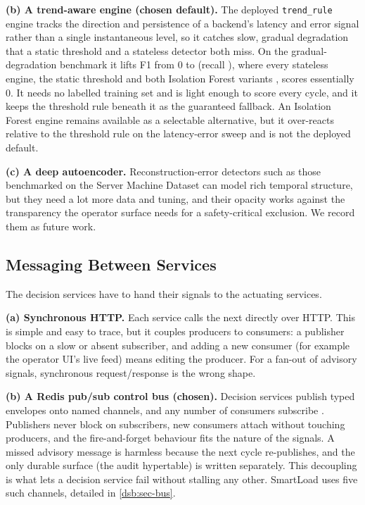 \textbf{(b) A trend-aware engine (chosen default).} The deployed
\texttt{trend\_rule} engine tracks the direction and persistence of a backend's
latency and error signal rather than a single instantaneous level, so it catches
slow, gradual degradation that a static threshold and a stateless detector both
miss. On the gradual-degradation benchmark it lifts F1 from $0$ to \BManFone{} (recall
\BManRecall{}), where every stateless engine, the static threshold and both Isolation
Forest variants \cite{liu2008isolationforest}, scores essentially $0$. It needs no
labelled training set and is light enough to score every cycle, and it keeps the
threshold rule beneath it as the guaranteed fallback. An Isolation Forest engine
remains available as a selectable alternative, but it over-reacts relative to the
threshold rule on the latency-error sweep and is not the deployed default.

\textbf{(c) A deep autoencoder.} Reconstruction-error detectors such as those
benchmarked on the Server Machine Dataset \cite{su2019omnianomaly} can model
rich temporal structure, but they need a lot more data and tuning, and their
opacity works against the transparency the operator surface needs for a
safety-critical exclusion. We record them as future work.

\subsection{Messaging Between Services}
\label{dsb:alt-messaging}

The decision services have to hand their signals to the actuating services.

\textbf{(a) Synchronous HTTP.} Each service calls the next directly over HTTP.
This is simple and easy to trace, but it couples producers to consumers: a
publisher blocks on a slow or absent subscriber, and adding a new consumer (for
example the operator UI's live feed) means editing the producer. For a fan-out
of advisory signals, synchronous request/response is the wrong shape.

\textbf{(b) A Redis pub/sub control bus (chosen).} Decision services publish
typed envelopes onto named channels, and any number of consumers subscribe
\cite{carlson2013redis}. Publishers never block on subscribers, new consumers
attach without touching producers, and the fire-and-forget behaviour fits the
nature of the signals. A missed advisory message is harmless because the next
cycle re-publishes, and the only durable surface (the audit hypertable) is
written separately. This decoupling is what lets a decision service fail without
stalling any other. SmartLoad uses five such channels, detailed in
\cref{dsb:sec-bus}.

